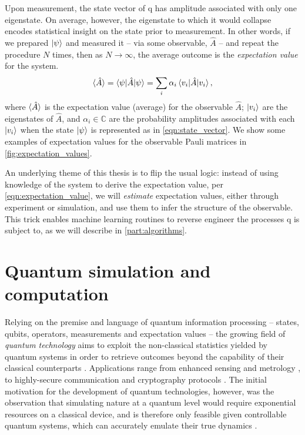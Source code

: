 Upon measurement, the state vector of \gls{q} has amplitude associated with only one eigenstate. 
On average, however, the eigenstate to which it would collapse encodes statistical insight on the 
    state prior to measurement. 
In other words, if we prepared $\ket{\psi}$ and measured it -- via some observable, $\hat{A}$ -- 
    and repeat the procedure $N$ times, 
    then as $N \rightarrow \infty$, the average outcome is the \emph{\gls{expectation value}}
    for the system.
\begin{equation}
    \label{eqn:expectation_value}
    \braket{\hat{A}} = \braket{\psi | \hat{A} | \psi} = \sum\limits_{i} \alpha_i \braket{v_i | \hat{A} | v_i},  
\end{equation}
    where $\braket{\hat{A}}$ is the \gls{expectation value} (average) for the observable $\hat{A}$; 
    $\ket{v_i}$ are the eigenstates of $\hat{A}$, and $\alpha_i \in \mathbb{C}$ are the probability amplitudes
    associated with each $\ket{v_i}$ when the state $\ket{\psi}$ is represented as in \cref{eqn:state_vector}.
We show some examples of \glspl{expectation value} for the observable Pauli matrices in \cref{fig:expectation_values}. 
\par 

An underlying theme of this thesis is to flip the usual logic: 
    instead of using knowledge of the system to derive the \gls{expectation value}, per \cref{eqn:expectation_value},
    we will \emph{estimate} \glspl{expectation value}, either through experiment or simulation, 
    and use them to infer the structure of the observable.
This trick enables machine learning routines to reverse engineer 
    the processes \gls{q} is subject to, as we will describe in \cref{part:algorithms}. 


\section{Quantum simulation and computation}\label{sec:quantum_computation}

Relying on the premise and language of quantum information processing 
    -- states, qubits, operators, measurements and expectation values -- 
    the growing field of \emph{quantum technology} aims to exploit the 
    non-classical statistics yielded by quantum systems in order to retrieve 
    outcomes beyond the capability of their classical counterparts \cite{dowling2003quantum}. 
Applications range from enhanced sensing and metrology \cite{giovannetti2004quantum, giovannetti2011advances}, 
    to highly-secure communication and cryptography protocols \cite{bennett2020quantum, ekert1991quantum, gisin2002quantum}.
The initial motivation for the development of quantum technologies, however, 
    was the  observation that simulating nature at a quantum level would require 
    exponential resources on a classical device, and is therefore only feasible given controllable quantum systems,
    which can accurately emulate their true dynamics \cite{feynman1982simulating, manin1980vychislimoe, benioff1980computer, benioff1982quantum}. 

